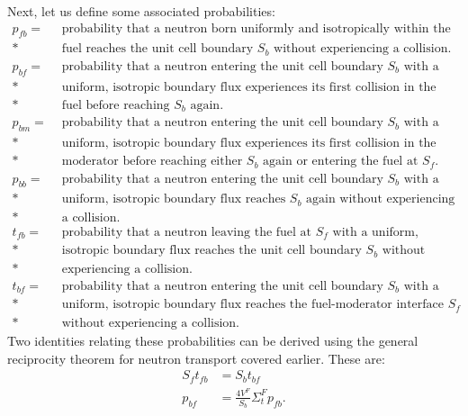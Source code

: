 Next, let us define some associated probabilities:
\begin{align}
  p_{fb} = &\text{ probability that a neutron born uniformly and isotropically within the } \nonumber \\*
           &\text{ fuel reaches the unit cell boundary $S_b$ without experiencing a collision.} \nonumber \\
  p_{bf} = &\text{ probability that a neutron entering the unit cell boundary $S_b$ with a } \nonumber \\*
           &\text{ uniform, isotropic boundary flux experiences its first collision in the } \nonumber \\*
           &\text{ fuel before reaching $S_b$ again.} \nonumber \\
  p_{bm} = &\text{ probability that a neutron entering the unit cell boundary $S_b$ with a } \nonumber \\*
           &\text{ uniform, isotropic boundary flux experiences its first collision in the } \nonumber \\*
           &\text{ moderator before reaching either $S_b$ again or entering the fuel at $S_f$.} \nonumber \\
  p_{bb} = &\text{ probability that a neutron entering the unit cell boundary $S_b$ with a } \nonumber \\*
           &\text{ uniform, isotropic boundary flux reaches $S_b$ again without experiencing } \nonumber \\*
           &\text{ a collision.} \nonumber \\
  t_{fb} = &\text{ probability that a neutron leaving the fuel at $S_f$ with a uniform,} \nonumber \\*
           &\text{ isotropic boundary flux reaches the unit cell boundary $S_b$ without } \nonumber \\*
           &\text{ experiencing a collision.} \nonumber \\
  t_{bf} = &\text{ probability that a neutron entering the unit cell boundary $S_b$ with a } \nonumber \\*
           &\text{ uniform, isotropic boundary flux reaches the fuel-moderator interface $S_f$} \nonumber \\*
           &\text{ without experiencing a collision.} \nonumber 
\end{align}
Two identities relating these probabilities can be derived using the general reciprocity theorem for neutron transport covered earlier. These are:
\begin{align}
  S_f t_{fb} &= S_b t_{bf} \label{Eqn:LatticePhyics_UnitCellFuelTransmissionIdentity} \\
  p_{bf} &= \frac{4V^F}{S_b} \Sigma_t^F p_{fb}. \label{Eqn:LatticePhyics_UnitCellFuelExtendedBlacknessIdentity}
\end{align}

